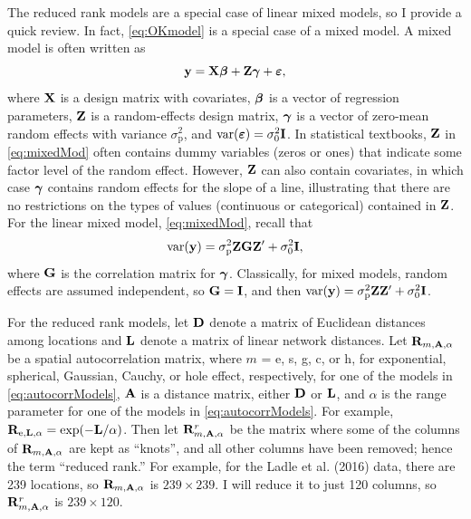 \documentclass[11pt, titlepage]{article}\usepackage[]{graphicx}\usepackage[]{color}
\begin{document}
\begin{spacing}{1.9}
\begin{flushleft}
The reduced rank models are a special case of linear mixed models, so I provide a quick review. In fact, \ref{eq:OKmodel} is a special case of a mixed model. A mixed model is often written as
\begin{equation} \label{eq:mixedMod}
    \mathbf{y} = \mathbf{X}{\boldsymbol{\beta}} + \mathbf{Z}\mbox{\boldmath $\gamma$} + \mbox{\boldmath $\varepsilon$},
\end{equation}
 where $\mathbf{X}$ is a design matrix with covariates, ${\boldsymbol{\beta}}$ is a vector of regression parameters, $\mathbf{Z}$ is a random-effects design matrix, $\mbox{\boldmath $\gamma$}$ is a vector of zero-mean random effects with variance $\sigma^2_\textrm{p}$, and $\textrm{var}(\mbox{\boldmath $\varepsilon$}) = \sigma^2_0 \mathbf{I}$.  In statistical textbooks, $\mathbf{Z}$ in \ref{eq:mixedMod} often contains dummy variables (zeros or ones) that indicate some factor level of the random effect.  However, $\mathbf{Z}$ can also contain covariates, in which case $\mbox{\boldmath $\gamma$}$ contains random effects for the slope of a line, illustrating that there are no restrictions on the types of values (continuous or categorical) contained in $\mathbf{Z}$. For the linear mixed model, \ref{eq:mixedMod}, recall that
 \begin{equation} \label{eq:varMixedMod}
 \textrm{var}(\mathbf{y}) = \sigma^2_\textrm{p}\mathbf{Z}\mathbf{G}\mathbf{Z}^{\prime} + \sigma^2_0\mathbf{I}, 
 \end{equation}
 where $\mathbf{G}$ is the correlation matrix for $\mbox{\boldmath $\gamma$}$.  Classically, for mixed models, random effects are assumed independent, so $\mathbf{G} = \mathbf{I}$, and then $\textrm{var}(\mathbf{y}) = \sigma^2_\textrm{p}\mathbf{Z}\mathbf{Z}^{\prime} + \sigma^2_0\mathbf{I}$.  

 For the reduced rank models, let $\mathbf{D}$ denote a matrix of Euclidean distances among locations and $\mathbf{L}$ denote a matrix of linear network distances. Let $\mathbf{R}_{m,\mathbf{A},\alpha}$ be a spatial autocorrelation matrix, where $m$ = e, s, g, c, or h, for exponential, spherical, Gaussian, Cauchy, or hole effect, respectively, for one of the models in \ref{eq:autocorrModels}, $\mathbf{A}$ is a distance matrix, either $\mathbf{D}$ or $\mathbf{L}$, and $\alpha$ is the range parameter for one of the models in \ref{eq:autocorrModels}.  For example, $\mathbf{R}_{\textrm{e},\mathbf{L},\alpha} = \exp(-\mathbf{L}/\alpha)$.  Then let $\mathbf{R}^r_{m,\mathbf{A},\alpha}$ be the matrix where some of the columns of $\mathbf{R}_{m,\mathbf{A},\alpha}$ are kept as ``knots'', and all other columns have been removed; hence the term ``reduced rank.''  For example, for the Ladle et al. (2016) data, there are 239 locations, so $\mathbf{R}_{m,\mathbf{A},\alpha}$ is $239 \times 239$. I will reduce it to just 120 columns, so $\mathbf{R}^r_{m,\mathbf{A},\alpha}$ is $239 \times 120$.  


\end{flushleft}
\end{spacing}
\end{document}
